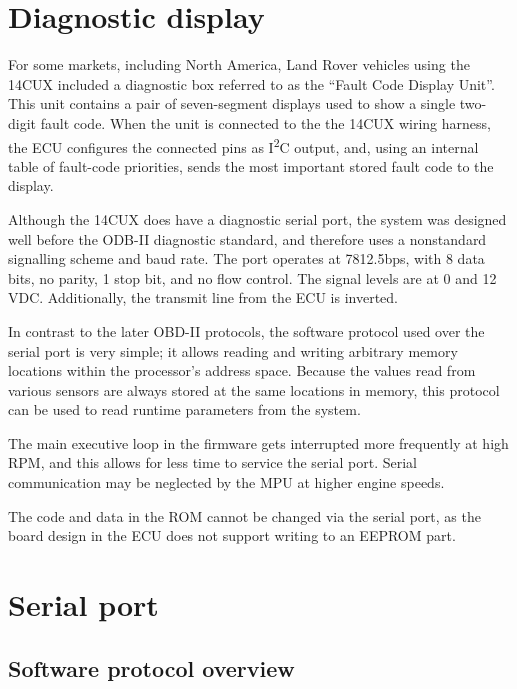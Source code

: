 \documentclass[11pt,twocolumn]{scrartcl}
\begin{document}
\section {Diagnostic display}
For some markets, including North America, Land Rover vehicles using the 14CUX included a diagnostic box referred to as the ``Fault Code Display Unit''. This unit contains a pair of seven-segment displays used to show a single two-digit fault code. When the unit is connected to the the 14CUX wiring harness, the ECU configures the connected pins as I\textsuperscript{2}C output, and, using an internal table of fault-code priorities, sends the most important stored fault code to the display.

Although the 14CUX does have a diagnostic serial port, the system was designed well before the ODB-II diagnostic standard, and therefore uses a nonstandard signalling scheme and baud rate. The port operates at 7812.5bps, with 8 data bits, no parity, 1 stop bit, and no flow control. The signal levels are at 0 and 12 VDC. Additionally, the transmit line from the ECU is inverted.

In contrast to the later OBD-II protocols, the software protocol used over the serial port is very simple; it allows reading and writing arbitrary memory locations within the processor's address space. Because the values read from various sensors are always stored at the same locations in memory, this protocol can be used to read runtime parameters from the system.

The main executive loop in the firmware gets interrupted more frequently at high RPM, and this allows for less time to service the serial port. Serial communication may be neglected by the MPU at higher engine speeds.

The code and data in the ROM cannot be changed via the serial port, as the board design in the ECU does not support writing to an EEPROM part.

\section {Serial port}

\subsection {Software protocol overview}
\end{document}
